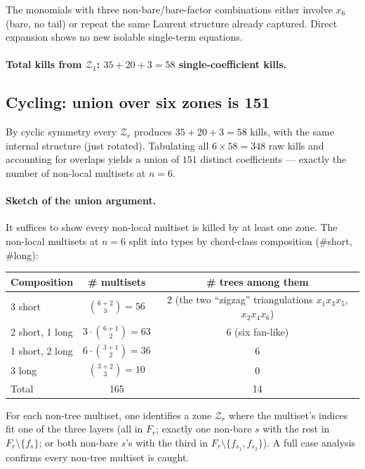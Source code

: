 \documentclass[11pt]{article}
\newcommand{\Z}{\mathcal{Z}}
\theoremstyle{definition}
\begin{document}
The monomials with three non-bare/bare-factor combinations either
involve $x_6$ (bare, no tail) or repeat the same Laurent structure already
captured. Direct expansion shows no new isolable single-term equations.

\paragraph{Total kills from $\Z_1$: $35+20+3 = 58$ single-coefficient kills.}

\subsection{Cycling: union over six zones is 151}

By cyclic symmetry every $\Z_r$ produces $35+20+3=58$ kills, with the same
internal structure (just rotated). Tabulating all $6\times 58=348$ raw
kills and accounting for overlaps yields a union of $151$ distinct
coefficients --- exactly the number of non-local multisets at $n=6$.

\paragraph{Sketch of the union argument.} It suffices to show every
non-local multiset is killed by at least one zone. The non-local multisets
at $n=6$ split into types by chord-class composition (\#short, \#long):

\begin{center}
\begin{tabular}{l|c|c}
\toprule
Composition & \# multisets & \# trees among them \\
\midrule
3 short & $\binom{6+2}{3}=56$ & 2 (the two ``zigzag'' triangulations $x_1x_3x_5$, $x_2x_4x_6$) \\
2 short, 1 long & $3\cdot \binom{6+1}{2}=63$ & 6 (six fan-like) \\
1 short, 2 long & $6\cdot \binom{3+1}{2}=36$ & 6 \\
3 long & $\binom{3+2}{3}=10$ & 0 \\
\midrule
Total & 165 & 14 \\
\bottomrule
\end{tabular}
\end{center}

For each non-tree multiset, one identifies a zone $\Z_r$ where the
multiset's indices fit one of the three layers (all in $F_r$;
exactly one non-bare $s$ with the rest in $F_r\setminus\{f_s\}$; or both
non-bare $s$'s with the third in $F_r\setminus\{f_{s_1},f_{s_2}\}$).
A full case analysis confirms every non-tree multiset is caught.
\end{document}

